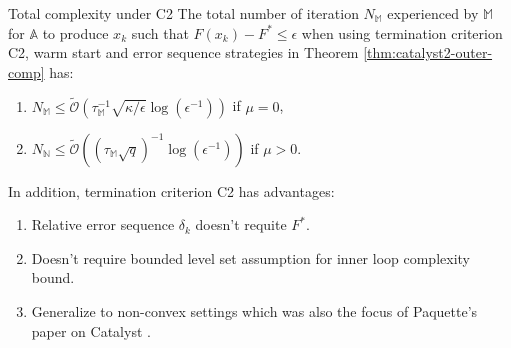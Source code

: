 \documentclass[11pt]{beamer}
\theoremstyle{definition}
\begin{document}
        \begin{frame}{Total complexity under C2}
            The total number of iteration $N_{\mathbb M}$ experienced by $\mathbb M$ for $\mathbb A$ to produce $x_k$ such that $F(x_k) - F^* \le \epsilon$ when using termination criterion C2, warm start and error sequence strategies in Theorem \ref{thm:catalyst2-outer-comp} has: 
            \begin{enumerate}
                \item $N_{\mathbb M} \le \widetilde{\mathcal O}\left(\tau_{\mathbb M}^{-1}\sqrt{\kappa/\epsilon}\log(\epsilon^{-1})\right)$ if $\mu = 0$, 
                \item $N_{\mathbb N}\le \widetilde{\mathcal O}\left((\tau_{\mathbb M}\sqrt{q})^{-1}\log(\epsilon^{-1})\right)$ if $\mu > 0$. 
            \end{enumerate}
            In addition, termination criterion C2 has advantages: 
            \begin{enumerate}
                \item Relative error sequence $\delta_k$ doesn't requite $F^*$. 
                \item Doesn't require bounded level set assumption for inner loop complexity bound. 
                \item Generalize to non-convex settings which was also the focus of Paquette's paper on Catalyst \cite{paquette_catalyst_2018}. 
            \end{enumerate}
        \end{frame}
\end{document}
